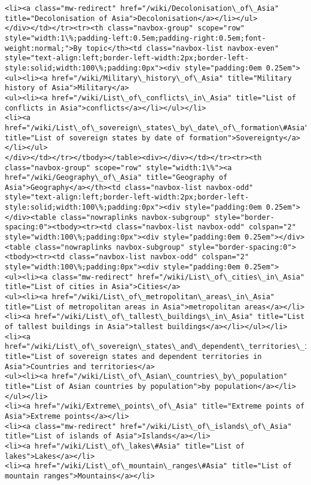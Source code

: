 \documentclass[11pt]{article}
\begin{document}
\begin{Verbatim}[commandchars=\\\{\}]
<li><a class="mw-redirect" href="/wiki/Decolonisation\_of\_Asia" title="Decolonisation of Asia">Decolonisation</a></li></ul>
</div></td></tr><tr><th class="navbox-group" scope="row" style="width:1\%;padding-left:0.5em;padding-right:0.5em;font-weight:normal;">By topic</th><td class="navbox-list navbox-even" style="text-align:left;border-left-width:2px;border-left-style:solid;width:100\%;padding:0px"><div style="padding:0em 0.25em">
<ul><li><a href="/wiki/Military\_history\_of\_Asia" title="Military history of Asia">Military</a>
<ul><li><a href="/wiki/List\_of\_conflicts\_in\_Asia" title="List of conflicts in Asia">conflicts</a></li></ul></li>
<li><a href="/wiki/List\_of\_sovereign\_states\_by\_date\_of\_formation\#Asia" title="List of sovereign states by date of formation">Sovereignty</a></li></ul>
</div></td></tr></tbody></table><div></div></td></tr><tr><th class="navbox-group" scope="row" style="width:1\%"><a href="/wiki/Geography\_of\_Asia" title="Geography of Asia">Geography</a></th><td class="navbox-list navbox-odd" style="text-align:left;border-left-width:2px;border-left-style:solid;width:100\%;padding:0px"><div style="padding:0em 0.25em"></div><table class="nowraplinks navbox-subgroup" style="border-spacing:0"><tbody><tr><td class="navbox-list navbox-odd" colspan="2" style="width:100\%;padding:0px"><div style="padding:0em 0.25em"></div><table class="nowraplinks navbox-subgroup" style="border-spacing:0"><tbody><tr><td class="navbox-list navbox-odd" colspan="2" style="width:100\%;padding:0px"><div style="padding:0em 0.25em">
<ul><li><a class="mw-redirect" href="/wiki/List\_of\_cities\_in\_Asia" title="List of cities in Asia">Cities</a>
<ul><li><a href="/wiki/List\_of\_metropolitan\_areas\_in\_Asia" title="List of metropolitan areas in Asia">metropolitan areas</a></li>
<li><a href="/wiki/List\_of\_tallest\_buildings\_in\_Asia" title="List of tallest buildings in Asia">tallest buildings</a></li></ul></li>
<li><a href="/wiki/List\_of\_sovereign\_states\_and\_dependent\_territories\_in\_Asia" title="List of sovereign states and dependent territories in Asia">Countries and territories</a>
<ul><li><a href="/wiki/List\_of\_Asian\_countries\_by\_population" title="List of Asian countries by population">by population</a></li></ul></li>
<li><a href="/wiki/Extreme\_points\_of\_Asia" title="Extreme points of Asia">Extreme points</a></li>
<li><a class="mw-redirect" href="/wiki/List\_of\_islands\_of\_Asia" title="List of islands of Asia">Islands</a></li>
<li><a href="/wiki/List\_of\_lakes\#Asia" title="List of lakes">Lakes</a></li>
<li><a href="/wiki/List\_of\_mountain\_ranges\#Asia" title="List of mountain ranges">Mountains</a></li>

\end{Verbatim}
\end{document}
